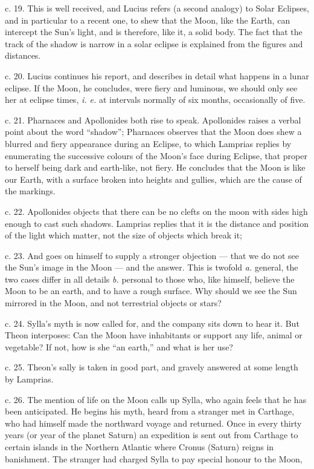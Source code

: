 \documentclass[a4paper, 11pt, oneside, polutonikogreek, english]{article}
\begin{document}
c. 19. This is well received, and Lucius refers (a second analogy) to Solar Eclipses, and in particular to a recent one, to shew that the Moon, like the Earth, can intercept the Sun's light, and is therefore, like it, a solid body. The fact that the track of the shadow is narrow in a solar eclipse is explained from the figures and distances.

c. 20. Lucius continues his report, and describes in detail what happens in a lunar eclipse. If the Moon, he concludes, were fiery and luminous, we should only see her at eclipse times, \emph{i. e.} at intervals normally of six months, occasionally of five.

c. 21. Pharnaces and Apollonides both rise to speak. Apollonides raises a verbal point about the word ``shadow''; Pharnaces observes that the Moon does shew a blurred and fiery appearance during an Eclipse, to which Lamprias replies by enumerating the successive colours of the Moon's face during Eclipse, that proper to herself being dark and earth-like, not fiery. He concludes that the Moon is like our Earth, with a surface broken into heights and gullies, which are the cause of the markings.

c. 22. Apollonides objects that there can be no clefts on the moon with sides high enough to cast such shadows. Lamprias replies that it is the distance and position of the light which matter, not the size of objects which break it; 

c. 23. And goes on himself to supply a stronger objection --- that we do not see the Sun's image in the Moon --- and the answer. This is twofold \emph{a.} general, the two cases differ in all details \emph{b.} personal to those who, like himself, believe the Moon to be an earth, and to have a rough surface. Why should we see the Sun mirrored in the Moon, and not terrestrial objects or stars?

c. 24. Sylla's myth is now called for, and the company sits down to hear it. But Theon interposes: Can the Moon have inhabitants or support any life, animal or vegetable? If not, how is she ``an earth,'' and what is her use?

c. 25. Theon's sally is taken in good part, and gravely answered at some length by Lamprias.

c. 26. The mention of life on the Moon calls up Sylla, who again feels that he has been anticipated. He begins his myth, heard from a stranger met in Carthage, who had himself made the northward voyage and returned. Once in every thirty years (or year of the planet Saturn) an expedition is sent out from Carthage to certain islands in the Northern Atlantic where Cronus (Saturn) reigns in banishment. The stranger had charged Sylla to pay special honour to the Moon, 
\end{document}

